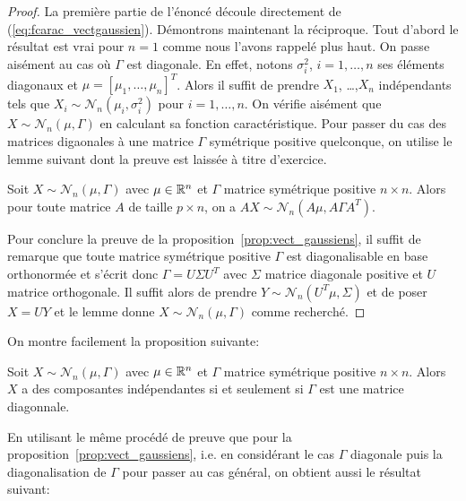  \begin{proof}\smartqed
   La premi\`ere partie de l'\'enonc\'e d\'ecoule directement de
   (\ref{eq:fcarac_vectgaussien}).  D\'emontrons maintenant la r\'eciproque. Tout
   d'abord le r\'esultat est vrai pour $n=1$ comme nous l'avons rappel\'e plus haut. On
   passe ais\'ement au cas o\`u $\Gamma$ est diagonale. En effet, notons
   $\sigma_i^2$, $i=1,\dots,n$ ses \'el\'ements diagonaux et
   $\mu=[\mu_1,\dots,\mu_n]^T$. Alors il suffit de prendre $X_1$, \dots ,$X_n$
   ind\'ependants tels que $X_i\sim\mathcal{N}_n( \mu_i, \sigma_i^2)$ pour
   $i=1,\dots,n$. On v\'erifie ais\'ement que $X\sim\mathcal{N}_n( \mu, \Gamma)$ en
   calculant sa fonction caract\'eristique. Pour passer du cas des matrices
   digaonales \`a une matrice $\Gamma$ sym\'etrique
   positive quelconque, on utilise le lemme suivant dont la preuve est laiss\'ee
   \`a titre d'exercice.
   \begin{lemma}
     Soit $X\sim\mathcal{N}_n( \mu, \Gamma)$ avec $\mu\in\mathbb{R}^n$ et
      $\Gamma$ matrice sym\'etrique positive $n\times n$. Alors pour toute
      matrice $A$ de taille $p\times n$, on a  $AX\sim\mathcal{N}_n( A\mu,
      A\Gamma A^T)$.
   \end{lemma}
   Pour conclure la preuve de la proposition~\ref{prop:vect_gaussiens}, il
   suffit de remarque que toute matrice sym\'etrique
   positive $\Gamma$ est diagonalisable en base orthonorm\'ee et s'\'ecrit donc
   $\Gamma=U\Sigma U^T$ avec $\Sigma$ matrice diagonale positive et $U$ matrice
   orthogonale. Il suffit alors de prendre $Y\sim\mathcal{N}_n( U^T\mu, \Sigma)$
   et de poser $X=UY$ et le lemme donne $X\sim\mathcal{N}_n( \mu, \Gamma)$
   comme recherch\'e.
\end{proof}

On montre facilement la proposition suivante:

\begin{proposition}\label{prop:vect_gaussiens_indep}
   Soit $X\sim\mathcal{N}_n( \mu, \Gamma)$ avec $\mu\in\mathbb{R}^n$ et $\Gamma$
   matrice sym\'etrique positive $n\times n$. Alors $X$ a des composantes
   ind\'ependantes si et seulement si $\Gamma$ est une matrice diagonnale.
 \end{proposition}


En utilisant le m\^{e}me proc\'ed\'e de preuve que pour la
proposition~\ref{prop:vect_gaussiens}, i.e. en consid\'erant le cas $\Gamma$
diagonale puis la diagonalisation de $\Gamma$ pour passer au cas g\'en\'eral, on
obtient aussi le r\'esultat suivant:

